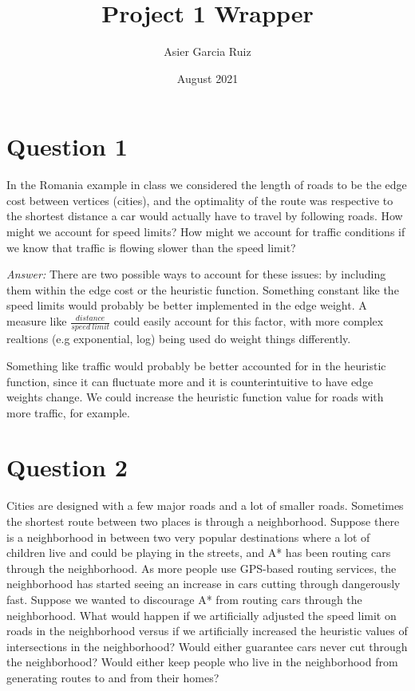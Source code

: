 \documentclass{article}
\title{Project 1 Wrapper}
\author{Asier Garcia Ruiz }
\date{August 2021}
\begin{document}
\maketitle
\section*{Question 1}
In the Romania example in class we considered the length of roads to be the edge cost between vertices (cities),
and the optimality of the route was respective to the shortest distance a car would actually have to travel by following roads.
How might we account for speed limits? How might we account for traffic conditions if we know that traffic is flowing slower
than the speed limit?

\textit{Answer:}
There are two possible ways to account for these issues: by including them within the edge cost or the heuristic function.
Something constant like the speed limits would probably be better implemented in the edge weight.
A measure like $\frac{distance}{speed\ limit}$ could easily account for this factor, with
more complex realtions (e.g exponential, log) being used do weight things differently.

Something like traffic would probably be better accounted for in the heuristic function, since it can fluctuate more
and it is counterintuitive to have edge weights change. We could increase the heuristic function value for
roads with more traffic, for example.

\section*{Question 2}
Cities are designed with a few major roads and a lot of smaller roads.  Sometimes the shortest route between two
places is through a neighborhood. Suppose there is a neighborhood in between two very popular destinations where a
lot of children live and could be playing in the streets, and A* has been routing cars through  the  neighborhood.
As  more  people  use  GPS-based  routing  services, the neighborhood has started seeing an increase in cars cutting
through dangerously fast.  Suppose we wanted to discourage A* from routing cars through
the  neighborhood.   What  would  happen  if  we  artificially  adjusted  the  speed limit on roads in the neighborhood
versus if we artificially increased the heuristic  values  of  intersections  in  the  neighborhood?
Would  either  guarantee  cars never cut through the neighborhood? Would either keep people who live in
the neighborhood from generating routes to and from their homes?
\end{document}
